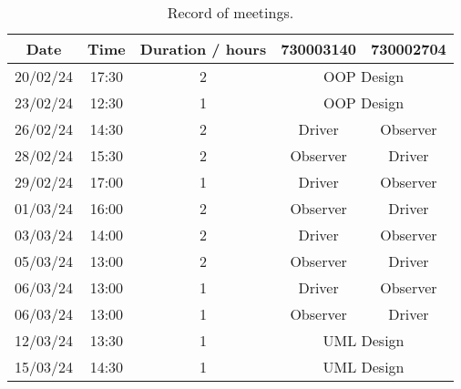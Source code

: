 \documentclass{article}
\begin{document}
\begin{titlepage}
        \begin{table}[htbp]
            \centering
            \begin{tabular}{ccccc}
                \toprule
                \textbf{Date} & \textbf{Time} & \textbf{Duration / hours} & \textbf{730003140}             & \textbf{730002704} \\
                \midrule
                20/02/24      & 17:30         & 2                         & \multicolumn{2}{c}{OOP Design}                      \\
                23/02/24      & 12:30         & 1                         & \multicolumn{2}{c}{OOP Design}                      \\
                26/02/24      & 14:30         & 2                         & Driver                         & Observer           \\
                28/02/24      & 15:30         & 2                         & Observer                       & Driver             \\
                29/02/24      & 17:00         & 1                         & Driver                         & Observer           \\
                01/03/24      & 16:00         & 2                         & Observer                       & Driver             \\
                03/03/24      & 14:00         & 2                         & Driver                         & Observer           \\
                05/03/24      & 13:00         & 2                         & Observer                       & Driver             \\
                06/03/24      & 13:00         & 1                         & Driver                         & Observer           \\
                06/03/24      & 13:00         & 1                         & Observer                       & Driver             \\
                12/03/24      & 13:30         & 1                         & \multicolumn{2}{c}{UML Design}                      \\
                15/03/24      & 14:30         & 1                         & \multicolumn{2}{c}{UML Design}                      \\
                \bottomrule
            \end{tabular}
            \caption{Record of meetings.}
        \end{table}

    \end{titlepage}
\end{document}
